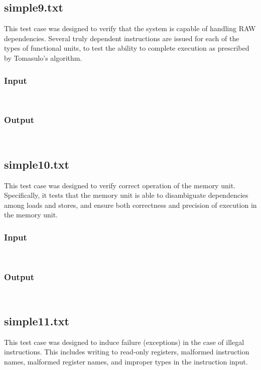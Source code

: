 \documentclass[12pt]{article}
\begin{document}
\subsection{simple9.txt}
This test case was designed to verify that the system is capable of handling RAW dependencies.  Several truly dependent instructions are issued for each of the types of functional units, to test the ability to complete execution as prescribed by Tomasulo's algorithm.

\subsubsection*{Input}
\begin{verbatim}
    
\end{verbatim}

\subsubsection*{Output}
\begin{verbatim}
    
\end{verbatim}

\subsection{simple10.txt}
This test case was designed to verify correct operation of the memory unit.  Specifically, it tests that the memory unit is able to disambiguate dependencies among loads and stores, and ensure both correctness and precision of execution in the memory unit.

\subsubsection*{Input}
\begin{verbatim}
    
\end{verbatim}

\subsubsection*{Output}
\begin{verbatim}
    
\end{verbatim}

\subsection{simple11.txt}
This test case was designed to induce failure (exceptions) in the case of illegal instructions.  This includes writing to read-only registers, malformed instruction names, malformed register names, and improper types in the instruction input.
\end{document}
